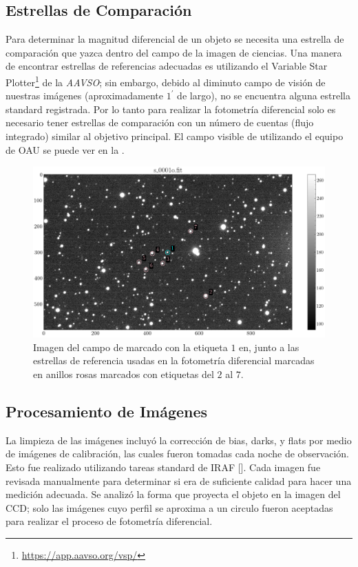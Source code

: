 \subsection{Estrellas de Comparación}

Para determinar la magnitud diferencial de un objeto se necesita una estrella de
comparación que yazca dentro del campo de la imagen de ciencias. Una manera de
encontrar estrellas de referencias adecuadas es utilizando el Variable Star
Plotter\footnote{\url{https://app.aavso.org/vsp/}} de la \textit{AAVSO}; sin
embargo, debido al diminuto campo de visión de nuestras imágenes
(aproximadamente $1^{\prime}$ de largo), no se encuentra alguna estrella
standard registrada. Por lo tanto para realizar la fotometría diferencial solo
es necesario tener estrellas de comparación con un número de cuentas (flujo
integrado) similar al objetivo principal. El campo visible de \atoObjId
utilizando el equipo de OAU se puede ver en la .

\begin{figure}[!ht]
	\centering
	\includegraphics[scale=0.5]{Observaciones/Secciones/Figures/Figura Campo Observado.png}
	\caption{Imagen del campo de \atoObjId marcado con la etiqueta $1$ en, 
	junto a las estrellas de referencia usadas en la fotometría diferencial 
	marcadas en anillos rosas marcados con etiquetas del $2$ al $7$.}
	\label{figuraCcdCampo}
\end{figure}

\subsection{Procesamiento de Imágenes}

La limpieza de las imágenes incluyó la corrección de bias, darks, y flats por
medio de imágenes de calibración, las cuales fueron tomadas cada noche de
observación. Esto fue realizado utilizando tareas standard de IRAF
[]. Cada imagen fue revisada manualmente para
determinar si era de suficiente calidad para hacer una medición adecuada. Se
analizó la forma que proyecta el objeto en la imagen del CCD; solo las imágenes
cuyo perfil se aproxima a un circulo fueron aceptadas para realizar el proceso
de fotometría diferencial.

